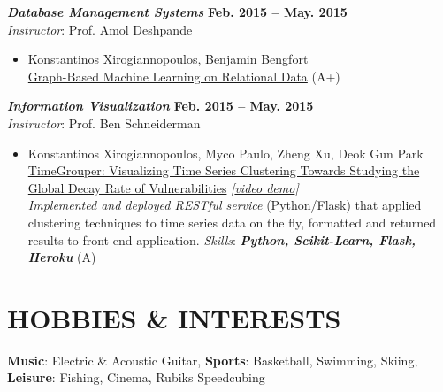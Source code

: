 \documentclass[margin, 10pt]{res} %
\begin{document}
\begin{resume}
{\sl \textbf{Database Management Systems}} \hfill \textbf{Feb. 2015 -- May. 2015}\\
\textit{Instructor}: Prof. Amol Deshpande
\begin{itemize}
  \item Konstantinos Xirogiannopoulos, Benjamin Bengfort\\
  \href{https://drive.google.com/open?id=0B20MIwp_I7FlUGhyVmFYcjFuYmM}{Graph-Based Machine Learning on Relational Data} (A+)
\end{itemize}

{\sl \textbf{Information Visualization}} \hfill \textbf{Feb. 2015 -- May. 2015}\\
\textit{Instructor}: Prof. Ben Schneiderman
\begin{itemize}
  \item Konstantinos Xirogiannopoulos, Myco Paulo, Zheng Xu, Deok Gun Park\\
  \href{https://wiki.cs.umd.edu/cmsc734_s15/images/f/fc/TimeGrouper_FinalReport.pdf}{TimeGrouper: Visualizing Time Series Clustering Towards Studying the Global Decay Rate of Vulnerabilities}  \textit{[\href{https://www.youtube.com/watch?v=oDgl6pp1CVU}{video demo}]}\\
  \textit{Implemented and deployed RESTful service} (Python/Flask) that applied clustering techniques to time series data on the fly, formatted and returned results to front-end application.  \textit{Skills}: \textbf{\textit{Python, Scikit-Learn, Flask, Heroku}} (A)
\end{itemize}



\section{HOBBIES \& INTERESTS}

\textbf{Music}: Electric \& Acoustic Guitar, \textbf{Sports}: Basketball, Swimming, Skiing, \textbf{Leisure}: Fishing, Cinema, Rubiks Speedcubing


\end{resume}
\end{document}

